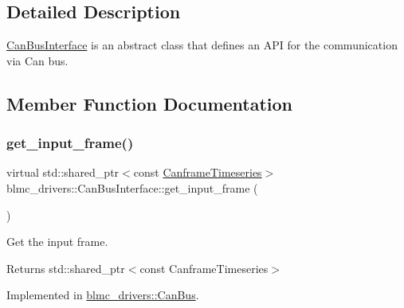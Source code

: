 \subsection{Detailed Description}
\hyperlink{classblmc__drivers_1_1CanBusInterface}{Can\+Bus\+Interface} is an abstract class that defines an A\+PI for the communication via Can bus. 

\subsection{Member Function Documentation}
\mbox{\label{classblmc__drivers_1_1CanBusInterface_a40b62805094dc0a454695a988ab0d403}} 
\subsubsection{\texorpdfstring{get\+\_\+input\+\_\+frame()}{get\_input\_frame()}}
{\footnotesize\ttfamily virtual std\+::shared\+\_\+ptr$<$const \hyperlink{classblmc__drivers_1_1CanBusInterface_a2da2627c961927f48359ae7d7e1aa4da}{Canframe\+Timeseries}$>$ blmc\+\_\+drivers\+::\+Can\+Bus\+Interface\+::get\+\_\+input\+\_\+frame (\begin{DoxyParamCaption}{ }\end{DoxyParamCaption})\hspace{0.3cm}{\ttfamily [pure virtual]}}



Get the input frame. 

\begin{DoxyReturn}{Returns}
std\+::shared\+\_\+ptr$<$const Canframe\+Timeseries$>$ 
\end{DoxyReturn}


Implemented in \hyperlink{classblmc__drivers_1_1CanBus_a5b9282bc65bff196e6d6b393fbdc5891}{blmc\+\_\+drivers\+::\+Can\+Bus}.

\mbox{\label{classblmc__drivers_1_1CanBusInterface_ac169b1c119b707d2946a999b81fb5a46}} 
